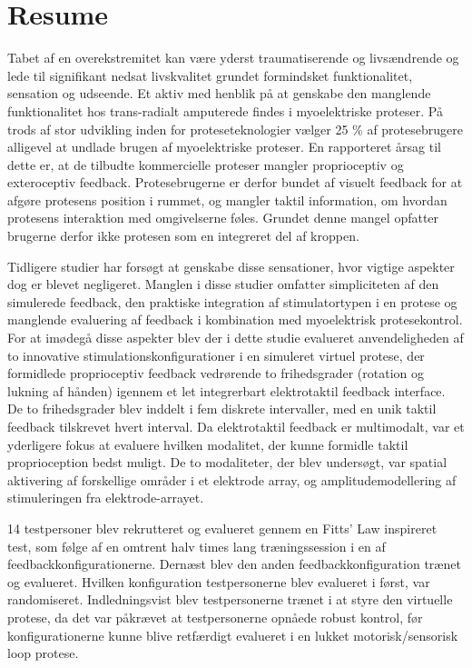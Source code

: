 \section*{Resume}

Tabet af en overekstremitet kan være yderst traumatiserende og livsændrende og lede til signifikant nedsat livskvalitet grundet formindsket funktionalitet, sensation og udseende. Et aktiv med henblik på at genskabe den manglende funktionalitet hos trans-radialt amputerede findes i myoelektriske proteser. På trods af stor udvikling inden for proteseteknologier vælger 25 \% af protesebrugere alligevel at undlade brugen af myoelektriske proteser. En rapporteret årsag til dette er, at de tilbudte kommercielle proteser mangler proprioceptiv og exteroceptiv feedback. Protesebrugerne er derfor bundet af visuelt feedback for at afgøre protesens position i rummet, og mangler taktil information, om hvordan protesens interaktion med omgivelserne føles. Grundet denne mangel opfatter brugerne derfor ikke protesen som en integreret del af kroppen. 

Tidligere studier har forsøgt at genskabe disse sensationer, hvor vigtige aspekter dog er blevet negligeret. Manglen i disse studier omfatter simpliciteten af den simulerede feedback, den praktiske integration af stimulatortypen i en protese og manglende evaluering af feedback i kombination med myoelektrisk protesekontrol. For at imødegå disse aspekter blev der i dette studie evalueret anvendeligheden af to innovative stimulationskonfigurationer i en simuleret virtuel protese, der formidlede proprioceptiv feedback vedrørende to frihedsgrader (rotation og lukning af hånden) igennem et let integrerbart elektrotaktil feedback interface. De to frihedsgrader blev inddelt i fem diskrete intervaller, med en unik taktil feedback tilskrevet hvert interval. Da elektrotaktil feedback er multimodalt, var et yderligere fokus at evaluere hvilken modalitet, der kunne formidle taktil proprioception bedst muligt. De to modaliteter, der blev undersøgt, var spatial aktivering af forskellige områder i et elektrode array, og amplitudemodellering af stimuleringen fra elektrode-arrayet. 

14 testpersoner blev rekrutteret og evalueret gennem en Fitts’ Law inspireret test, som følge af en omtrent halv times lang træningssession i en af feedbackkonfigurationerne. Dernæst blev den anden feedbackkonfiguration trænet og evalueret. Hvilken konfiguration testpersonerne blev evalueret i først, var randomiseret. Indledningsvist blev testpersonerne trænet i at styre den virtuelle protese, da det var påkrævet at testpersonerne opnåede robust kontrol, før konfigurationerne kunne blive retfærdigt evalueret i en lukket motorisk/sensorisk loop protese.

